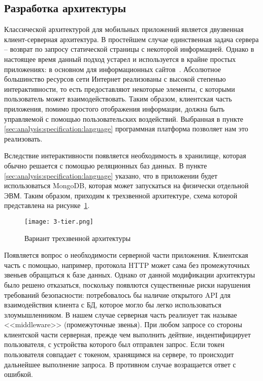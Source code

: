 \subsection{Разработка архитектуры}
\label{sec:design:architecture}

Классической архитектурой для мобильных приложений является двузвенная клиент-серверная архитектура. В простейшем случае единственная задача сервера -- возврат по запросу статической страницы с некоторой информацией. Однако в настоящее время данный подход устарел и используется в крайне простых приложениях: в основном для информационных сайтов~\cite{from_sites_to_webapps}. Абсолютное большинство ресурсов сети Интернет реализованы с высокой степенью интерактивности, то есть предоставляют некоторые элементы, с которыми пользователь может взаимодействовать. Таким образом, клиентская часть приложения, помимо простого отображения информации, должна быть управляемой с помощью пользовательских воздействий. Выбранная в пункте \ref{sec:analysis:specification:language} программная платформа позволяет нам это реализовать.

Вследствие интерактивности появляется необходимость в хранилище, которая обычно решается с помощью реляционных баз данных. В пункте \ref{sec:analysis:specification:language} указано, что в приложении будет использоваться MongoDB, которая может запускаться на физически отдельной ЭВМ. Таким образом, приходим к трехзвенной архитектуре, схема которой представлена на рисунке~\ref{fig:analysis:specification:language:3-tier}.

\begin{figure}[ht]
\centering
	\texttt{[image: 3-tier.png]}
	\caption{Вариант трехзвенной архитектуры}
	\label{fig:analysis:specification:language:3-tier}
\end{figure}

Появляется вопрос о необходимости серверной части приложения. Клиентская часть с помощью, например, протокола HTTP может сама без промежуточных звеньев обращаться к базе данных. Однако от данной модификации архитектуры было решено отказаться, поскольку появлются существенные риски нарушения требований безопасности: потребовалось бы наличие открытого API для взаимодействия клиента с БД, которое могло бы легко использоваться злоумышленником. В нашем случае серверная часть реализует так называе <<middleware>> (промежуточные звенья). При любом запросе со стороны клиентской части серверная, прежде чем выполнить дейтвие, индентифицирует пользователя, с устройства которого был отправлен запрос. Если токен пользователя совпадает с токеном, хранящимся на сервере, то происходит дальнейшее выполнение запроса. В противном случае возращается ответ с ошибкой.
